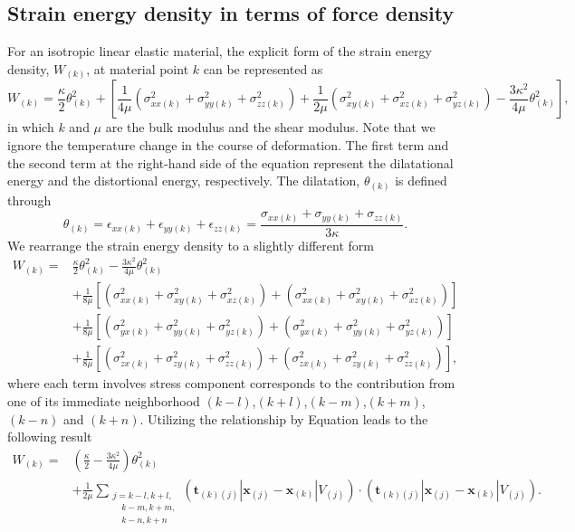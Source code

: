 \documentclass[11pt,fullpage]{article}
\newcommand{\mb}[1]{\mathbf{#1}}
\newcommand{\blue}[1]{{\color{blue}{{#1}}}}
\begin{document}
\subsection{Strain energy density in terms of force density}

For an isotropic linear elastic material, the explicit form of the strain energy density, $W_{(k)}$, at material point $k$ can be represented as
\begin{equation}
W_{(k)} = \frac{\kappa}{2}\theta_{(k)}^2+\left[\frac{1}{4\mu}(\sigma_{xx(k)}^2+\sigma_{yy(k)}^2+\sigma_{zz(k)}^2)
                                         +\frac{1}{2\mu}(\sigma_{xy(k)}^2+\sigma_{xz(k)}^2+\sigma_{yz(k)}^2)
                                         -\frac{3\kappa^2}{4\mu}\theta_{(k)}^2
                                    \right],
\label{eq:14}
\end{equation}
in which $k$ and $\mu$ are the bulk modulus and the shear modulus. Note that we ignore the temperature change in the course of deformation. The first term and the second term at the right-hand side of the equation represent the dilatational energy and the distortional energy, respectively. The dilatation, $\theta_{(k)}$ is defined through
\begin{equation}
\theta_{(k)} = \epsilon_{xx(k)}+\epsilon_{yy(k)}+\epsilon_{zz(k)} = \frac{\sigma_{xx(k)}+\sigma_{yy(k)}+\sigma_{zz(k)}}{3\kappa}.
\label{eq:15}
\end{equation}
We rearrange the strain energy density to a slightly different form
\begin{equation}
\begin{aligned}
W_{(k)} =& \frac{\kappa}{2}\theta_{(k)}^2 -\frac{3\kappa^2}{4\mu}\theta_{(k)}^2 \\
         &+\frac{1}{8\mu}\left[(\sigma_{xx(k)}^2+\sigma_{xy(k)}^2+\sigma_{xz(k)}^2) + (\sigma_{xx(k)}^2+\sigma_{xy(k)}^2+\sigma_{xz(k)}^2)\right]\\
         &+\frac{1}{8\mu}\left[(\sigma_{yx(k)}^2+\sigma_{yy(k)}^2+\sigma_{yz(k)}^2) + (\sigma_{yx(k)}^2+\sigma_{yy(k)}^2+\sigma_{yz(k)}^2)\right]\\
         &+\frac{1}{8\mu}\left[(\sigma_{zx(k)}^2+\sigma_{zy(k)}^2+\sigma_{zz(k)}^2) + (\sigma_{zx(k)}^2+\sigma_{zy(k)}^2+\sigma_{zz(k)}^2)\right],
\end{aligned}
\label{eq:16}
\end{equation}
where each term involves stress component corresponds to the contribution from one of its immediate neighborhood $(k-l)$,$(k+l)$,$(k-m)$,$(k+m)$,$(k-n)$ and $(k+n)$.
Utilizing the relationship by Equation \blue{\ref{eq:10}} leads to the following result
\begin{equation}
\begin{aligned}
W_{(k)} =& (\frac{\kappa}{2} -\frac{3\kappa^2}{4\mu})\theta_{(k)}^2 \\
         &+\frac{1}{2\mu}\sum_{\substack {j=k-l,k+l,\\ \quad k-m,k+m,\\ \quad k-n,k+n}}(\mb{t}_{(k)(j)}|\mb{x}_{(j)}-\mb{x}_{(k)}|V_{(j)})\cdot(\mb{t}_{(k)(j)}|\mb{x}_{(j)}-\mb{x}_{(k)}|V_{(j)}).
\end{aligned}
\label{eq:17}
\end{equation}
\end{document}
